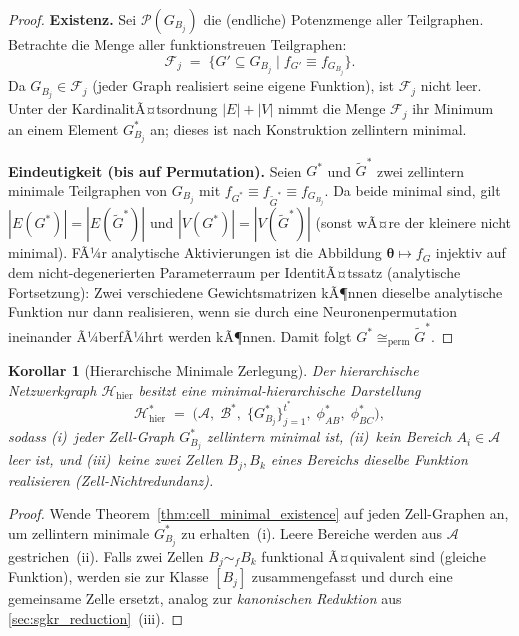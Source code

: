 ﻿\documentclass[12pt, a4paper, openany]{report}
\newtheorem{corollary}[theorem]{Korollar}
\newcommand{\calH}{\mathcal{H}}
\newcommand{\calA}{\mathcal{A}}
\newcommand{\calB}{\mathcal{B}}
\newcommand{\calF}{\mathcal{F}}
\newcommand{\calP}{\mathcal{P}}
\begin{document}
\begin{proof}
\textbf{Existenz.}
Sei $\calP(G_{B_j})$ die (endliche) Potenzmenge aller Teilgraphen.
Betrachte die Menge aller funktionstreuen Teilgraphen:
\[
  \calF_j \;=\; \bigl\{G' \subseteq G_{B_j} \;\big|\; f_{G'} \equiv f_{G_{B_j}}\bigr\}.
\]
Da $G_{B_j} \in \calF_j$ (jeder Graph realisiert seine eigene Funktion), ist
$\calF_j$ nicht leer.  Unter der KardinalitÃ¤tsordnung $|E| + |V|$ nimmt die
Menge $\calF_j$ ihr Minimum an einem Element $G^*_{B_j}$ an; dieses ist nach
Konstruktion zellintern minimal.

\textbf{Eindeutigkeit (bis auf Permutation).}
Seien $G^*$ und $\tilde{G}^*$ zwei zellintern minimale Teilgraphen von
$G_{B_j}$ mit $f_{G^*} \equiv f_{\tilde{G}^*} \equiv f_{G_{B_j}}$.  Da beide
minimal sind, gilt $|E(G^*)| = |E(\tilde{G}^*)|$ und $|V(G^*)| = |V(\tilde{G}^*)|$
(sonst wÃ¤re der kleinere nicht minimal).
FÃ¼r analytische Aktivierungen ist die Abbildung $\bm{\theta} \mapsto f_G$
injektiv auf dem nicht-degenerierten Parameterraum per IdentitÃ¤tssatz
(analytische Fortsetzung): Zwei verschiedene Gewichtsmatrizen kÃ¶nnen
dieselbe analytische Funktion nur dann realisieren, wenn sie durch eine
Neuronenpermutation ineinander Ã¼berfÃ¼hrt werden kÃ¶nnen.  Damit folgt
$G^* \cong_{\mathrm{perm}} \tilde{G}^*$.
\end{proof}

\begin{corollary}[Hierarchische Minimale Zerlegung]
\label{cor:hierarchical_decomposition}
Der hierarchische Netzwerkgraph $\calH_{\mathrm{hier}}$ besitzt eine
\emph{minimal-hierarchische Darstellung}
\[
  \calH^*_{\mathrm{hier}}
  \;=\;
  \bigl(\calA,\; \calB^*,\; \{G^*_{B_j}\}_{j=1}^{t^*},\;
        \phi^*_{AB},\; \phi^*_{BC}\bigr),
\]
sodass (i)~jeder Zell-Graph $G^*_{B_j}$ zellintern minimal ist,
(ii)~kein Bereich $A_i \in \calA$ leer ist, und (iii)~keine zwei
Zellen $B_j, B_k$ eines Bereichs dieselbe Funktion realisieren
(Zell-Nichtredundanz).
\end{corollary}

\begin{proof}
Wende Theorem~\ref{thm:cell_minimal_existence} auf jeden Zell-Graphen an,
um zellintern minimale $G^*_{B_j}$ zu erhalten~(i).  Leere Bereiche werden
aus $\calA$ gestrichen~(ii).  Falls zwei Zellen $B_j \sim_f B_k$ funktional
Ã¤quivalent sind (gleiche Funktion), werden sie zur Klasse $[B_j]$ zusammengefasst
und durch eine gemeinsame Zelle ersetzt, analog zur \emph{kanonischen Reduktion}
aus \cref{sec:sgkr_reduction}~(iii).
\end{proof}
\end{document}
